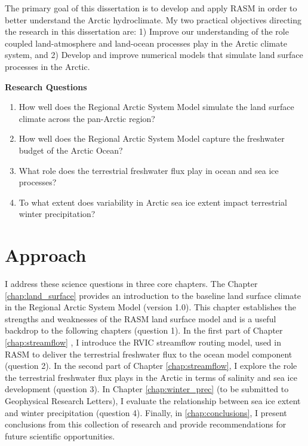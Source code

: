 The primary goal of this dissertation is to develop and apply RASM in order to better understand the Arctic hydroclimate.
My two practical objectives directing the research in this dissertation are: 1) Improve our understanding of the role coupled land-atmosphere and land-ocean processes play in the Arctic climate system, and 2) Develop and improve numerical models that simulate land surface processes in the Arctic.

\begin{mdframed}
  {\bf Research Questions}
  \begin{enumerate}
    \item How well does the Regional Arctic System Model simulate the land surface climate across the pan-Arctic region?
    \item How well does the Regional Arctic System Model capture the freshwater budget of the Arctic Ocean?
    \item What role does the terrestrial freshwater flux play in ocean and sea ice processes?
    \item To what extent does variability in Arctic sea ice extent impact terrestrial winter precipitation?
  \end{enumerate}
\end{mdframed}

\section{Approach}

I address these science questions in three core chapters.
The Chapter \ref{chap:land_surface} \citep[published as ][]{Hamman_2016a} provides an introduction to the baseline land surface climate in the Regional Arctic System Model (version 1.0).
This chapter establishes the strengths and weaknesses of the RASM land surface model and is a useful backdrop to the following chapters (question 1).
In the first part of Chapter \ref{chap:streamflow} \citep{Hamman_2016b}, I introduce the RVIC streamflow routing model, used in RASM to deliver the terrestrial freshwater flux to the ocean model component (question 2).
In the second part of Chapter \ref{chap:streamflow}, I explore the role the terrestrial freshwater flux plays in the Arctic in terms of salinity and sea ice development (question 3).
In Chapter \ref{chap:winter_prec} (to be submitted to Geophysical Research Letters), I evaluate the relationship between sea ice extent and winter precipitation (question 4).
Finally, in \ref{chap:conclusions}, I present conclusions from this collection of research and provide recommendations for future scientific opportunities.
